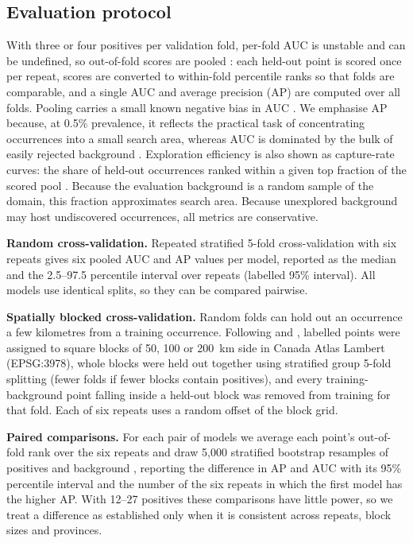 \documentclass[pdflatex,sn-apa]{sn-jnl}
\begin{document}
\subsection{Evaluation protocol}\label{sec:protocol}

With three or four positives per validation fold, per-fold AUC is unstable and can be undefined, so out-of-fold scores are pooled \citep{BradleyAP1997}: each held-out point is scored once per repeat, scores are converted to within-fold percentile ranks so that folds are comparable, and a single AUC and average precision (AP) are computed over all folds. Pooling carries a small known negative bias in AUC \citep{Airola2019,Parker2007}. We emphasise AP because, at 0.5\% prevalence, it reflects the practical task of concentrating occurrences into a small search area, whereas AUC is dominated by the bulk of easily rejected background \citep{Saito2015}. Exploration efficiency is also shown as capture-rate curves: the share of held-out occurrences ranked within a given top fraction of the scored pool \citep{Chung2003,Agterberg2005}. Because the evaluation background is a random sample of the domain, this fraction approximates search area. Because unexplored background may host undiscovered occurrences, all metrics are conservative.

\textbf{Random cross-validation.} Repeated stratified 5-fold cross-validation with six repeats gives six pooled AUC and AP values per model, reported as the median and the 2.5--97.5 percentile interval over repeats (labelled 95\% interval). All models use identical splits, so they can be compared pairwise.

\textbf{Spatially blocked cross-validation.} Random folds can hold out an occurrence a few kilometres from a training occurrence. Following \citet{Roberts2017} and \citet{Valavi2019}, labelled points were assigned to square blocks of 50, 100 or 200~km side in Canada Atlas Lambert (EPSG:3978), whole blocks were held out together using stratified group 5-fold splitting (fewer folds if fewer blocks contain positives), and every training-background point falling inside a held-out block was removed from training for that fold. Each of six repeats uses a random offset of the block grid.

\textbf{Paired comparisons.} For each pair of models we average each point's out-of-fold rank over the six repeats and draw 5,000 stratified bootstrap resamples of positives and background \citep{Efron1993}, reporting the difference in AP and AUC with its 95\% percentile interval and the number of the six repeats in which the first model has the higher AP. With 12--27 positives these comparisons have little power, so we treat a difference as established only when it is consistent across repeats, block sizes and provinces.
\end{document}
